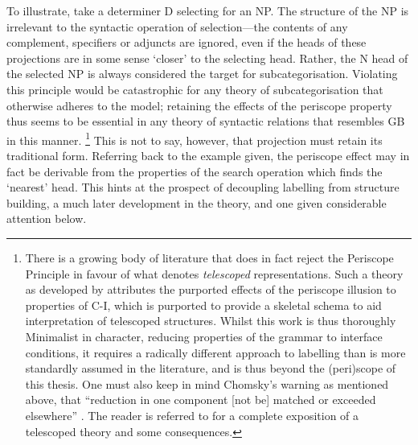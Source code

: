 To illustrate, take a determiner D selecting for an NP. The structure of the NP is irrelevant to the syntactic operation of selection---the contents of any complement, specifiers or adjuncts are ignored, even if the heads of these projections are in some sense `closer' to the selecting head. Rather, the N head of the selected NP is always considered the target for subcategorisation. Violating this principle would be catastrophic for any theory of subcategorisation that otherwise adheres to the model; retaining the effects of the periscope property thus seems to be essential in any theory of syntactic relations that resembles GB in this manner.%
\footnote{\label{fn:telescope}There is a growing body of literature that does in fact reject the Periscope Principle in favour of what \textcite{BrodyM_2000} denotes \textit{telescoped} representations. Such a theory as developed by \textcite{AdgerD_2013} attributes the purported effects of the periscope illusion to properties of C-I, which is purported to provide a skeletal schema to aid interpretation of telescoped structures. Whilst this work is thus thoroughly Minimalist in character, reducing properties of the grammar to interface conditions, it requires a radically different approach to labelling than is more standardly assumed in the literature, and is thus beyond the (peri)scope of this thesis. One must also keep in mind Chomsky's warning as mentioned above, that ``reduction in one component [not be] matched or exceeded elsewhere'' \parencite[13]{ChomskyN_1981}. The reader is referred to \textcite{AdgerD_2013} for a complete exposition of a telescoped theory and some consequences.}
This is not to say, however, that projection must retain its traditional form. Referring back to the example given, the periscope effect may in fact be derivable from the properties of the search operation which finds the `nearest' head. This hints at the prospect of decoupling labelling from structure building, a much later development in the theory, and one given considerable attention below.
